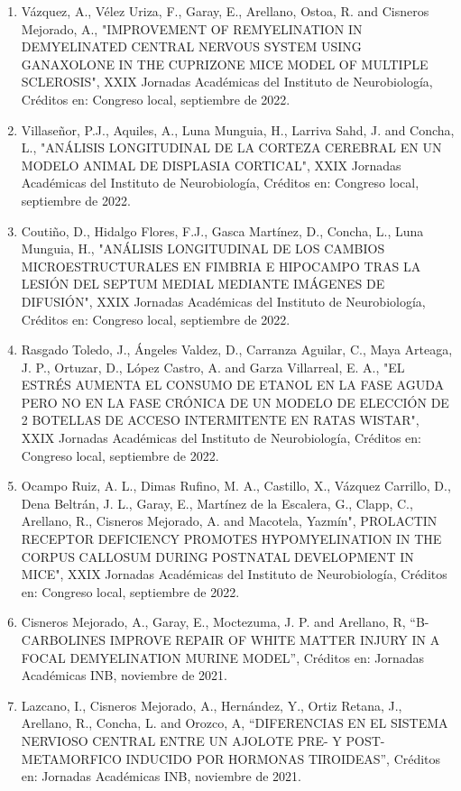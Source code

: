 \begin{enumerate}
\item Vázquez, A., Vélez Uriza, F., Garay, E., Arellano, Ostoa, R. and Cisneros Mejorado, A., "IMPROVEMENT OF REMYELINATION 
IN DEMYELINATED CENTRAL NERVOUS SYSTEM USING GANAXOLONE IN THE CUPRIZONE MICE MODEL OF MULTIPLE SCLEROSIS", XXIX Jornadas 
Académicas del Instituto de Neurobiología, Créditos en: Congreso local, septiembre de 2022.

\item Villaseñor, P.J., Aquiles, A., Luna Munguia, H., Larriva Sahd, J. and Concha, L., "ANÁLISIS LONGITUDINAL DE LA CORTEZA 
CEREBRAL EN UN MODELO ANIMAL DE DISPLASIA CORTICAL", XXIX Jornadas Académicas del Instituto de Neurobiología, Créditos en: 
Congreso local, septiembre de 2022.

\item Coutiño, D., Hidalgo Flores, F.J., Gasca Martínez, D., Concha, L., Luna Munguia, H., "ANÁLISIS LONGITUDINAL DE LOS 
CAMBIOS MICROESTRUCTURALES EN FIMBRIA E HIPOCAMPO TRAS LA LESIÓN DEL SEPTUM MEDIAL MEDIANTE IMÁGENES DE DIFUSIÓN", XXIX 
Jornadas Académicas del Instituto de Neurobiología, Créditos en: Congreso local, septiembre de 2022.

\item Rasgado Toledo, J., Ángeles Valdez, D., Carranza Aguilar, C., Maya Arteaga, J. P., Ortuzar, D., López Castro, A. and 
Garza Villarreal, E. A., "EL ESTRÉS AUMENTA EL CONSUMO DE ETANOL EN LA FASE AGUDA PERO NO EN LA FASE CRÓNICA DE UN MODELO 
DE ELECCIÓN DE 2 BOTELLAS DE ACCESO INTERMITENTE EN RATAS WISTAR", XXIX Jornadas Académicas del Instituto de Neurobiología, 
Créditos en: Congreso local, septiembre de 2022.

\item Ocampo Ruiz, A. L., Dimas Rufino, M. A., Castillo, X., Vázquez Carrillo, D., Dena Beltrán, J. L., Garay, E., Martínez 
de la Escalera, G., Clapp, C., Arellano, R., Cisneros Mejorado, A. and Macotela, Yazmín", PROLACTIN RECEPTOR DEFICIENCY 
PROMOTES HYPOMYELINATION IN THE CORPUS CALLOSUM DURING POSTNATAL DEVELOPMENT IN MICE", XXIX Jornadas Académicas del 
Instituto de Neurobiología, Créditos en: Congreso local, septiembre de 2022.

\item Cisneros Mejorado, A., Garay, E., Moctezuma, J. P. and Arellano, R, “B-CARBOLINES IMPROVE REPAIR OF WHITE MATTER INJURY 
IN A FOCAL DEMYELINATION MURINE MODEL”, Créditos en: Jornadas Académicas INB, noviembre de 2021.

\item Lazcano, I., Cisneros Mejorado, A., Hernández, Y., Ortiz Retana, J., Arellano, R., Concha, L. and Orozco, A, “DIFERENCIAS EN EL SISTEMA 
NERVIOSO CENTRAL ENTRE UN AJOLOTE PRE- Y POST- METAMORFICO 
INDUCIDO POR HORMONAS TIROIDEAS”, Créditos en: Jornadas Académicas INB, noviembre de 2021.


\end{enumerate}
